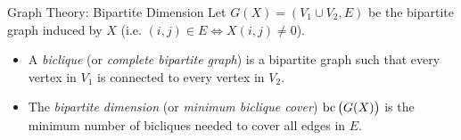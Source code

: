 \begin{frame}{Graph Theory: Bipartite Dimension}
Let $G(X) = (V_1 \cup V_2, E)$ be the bipartite graph induced by $X$ (i.e. $(i,j)\in E \iff X(i, j) \neq 0$).
\begin{defn}
\begin{itemize}
\item A \emph{biclique} (or \emph{complete bipartite graph}) is a bipartite graph such that every vertex in $V_1$ is connected to every vertex in $V_2$. 
\item The \emph{bipartite dimension} (or \emph{minimum biclique cover}) $\operatorname{bc}\big(G(X)\big)$ is the minimum number of bicliques needed to cover all edges in $E$.
\end{itemize} 
\end{defn}

\end{frame}

